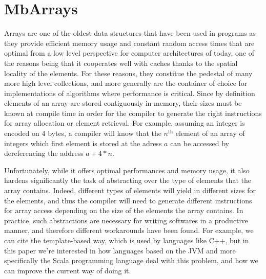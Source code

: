 \section{MbArrays}
\label{sec:mbarrays}


Arrays are one of the oldest data structures that have been used in programs as they provide efficient memory usage and constant random access times that are optimal from a low level perspective for computer architectures of today, one of the reasons being that it cooperates well with caches thanks to the spatial locality of the elements. For these reasons, they constitue the pedestal of many more high level collections, and more generally are the container of choice for implementations of algorithms where performance is critical. Since by definition elements of an array are stored contiguously in memory, their sizes must be known at compile time in order for the compiler to generate the right instructions for array allocation or element retrieval. For example, assuming an integer is encoded on 4 bytes, a compiler will know that the $n^\text{th}$ element of an array of integers which first element is stored at the adress $a$ can be accessed by dereferencing the address $a + 4*n$.


Unfortunately, while it offers optimal performances and memory usage, it also hardens significantly the task of abstracting over the type of elements that the array contains. Indeed, different types of elements will yield in different sizes for the elements, and thus the compiler will need to generate different instructions for array access depending on the size of the elements the array contains. In practice, such abstractions are necessary for writing softwares in a productive manner, and therefore different workarounds have been found. For example, we can cite the template-based way, which is used by languages like C++, but in this paper we're interested in how languages based on the JVM and more specifically the Scala programming language deal with this problem, and how we can improve the current way of doing it. 

